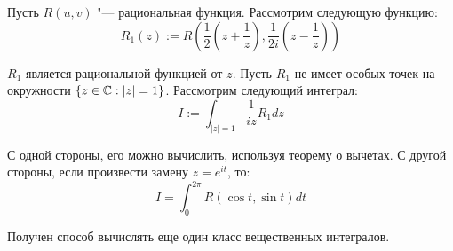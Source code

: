 \begin{note}
	Пусть $R(u, v)$ "--- рациональная функция. Рассмотрим следующую функцию:
	\[R_1(z) := R\left(\frac12\left(z + \frac1z\right), \frac1{2i}\left(z - \frac1z\right)\right)\]
	
	$R_1$ является рациональной функцией от $z$. Пусть $R_1$ не имеет особых точек на окружности $\{z \in \mathbb{C} : |z| = 1\}$. Рассмотрим следующий интеграл:
	\[I := \int_{|z| = 1}\frac{1}{iz}R_1dz\]
	
	С одной стороны, его можно вычислить, используя теорему о вычетах. С другой стороны, если произвести замену $z = e^{it}$, то:
	\[I = \int_{0}^{2\pi} R(\cos{t}, \sin{t})dt\]
	
	Получен способ вычислять еще один класс вещественных интегралов.
\end{note}